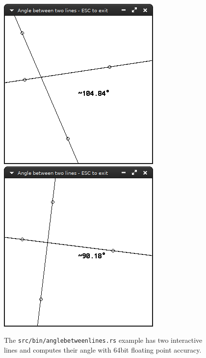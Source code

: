 \documentclass[12pt,openany,a4,usenames,dvipsnames]{book}
\DeclareRobustCommand{\Caption}[1]{\par%
  \vspace{1em}
  {\noindent{}#1}}
\begin{document}
\begin{figure}[H]
  \centering
  \begin{minipage}{0.49\textwidth}
    \includegraphics[width=\textwidth,keepaspectratio]{figures/anglelines1.png}
  \end{minipage}
  \hspace{.1em}
  \begin{minipage}{0.49\textwidth}
    \includegraphics[width=\textwidth,keepaspectratio]{figures/anglelines2.png}
  \end{minipage}
  \Caption{The \texttt{src/bin/anglebetweenlines.rs} example has two interactive lines and computes their angle with 64bit floating point accuracy.}
\end{figure}
\end{document}
